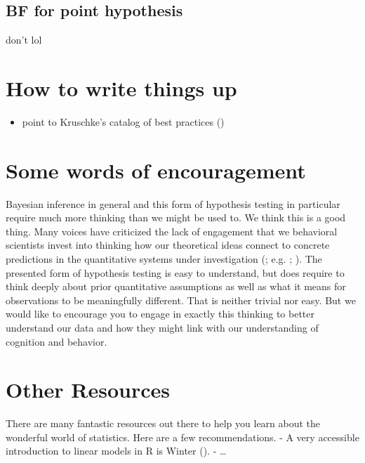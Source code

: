 \documentclass[
  doc,
  floatsintext,
  longtable,
  nolmodern,
  notxfonts,
  notimes,
  colorlinks=true,linkcolor=blue,citecolor=blue,urlcolor=blue]{apa7}
\providecommand{\tightlist}{%
  \setlength{\itemsep}{0pt}\setlength{\parskip}{0pt}}
\begin{document}
\subsection{BF for point hypothesis}\label{bf-for-point-hypothesis}

don't lol

\section{How to write things up}\label{how-to-write-things-up}

\begin{itemize}
\tightlist
\item
  point to Kruschke's catalog of best practices
  ()
\end{itemize}

\section{Some words of encouragement}\label{some-words-of-encouragement}

Bayesian inference in general and this form of hypothesis testing in
particular require much more thinking than we might be used to. We think
this is a good thing. Many voices have criticized the lack of engagement
that we behavioral scientists invest into thinking how our theoretical
ideas connect to concrete predictions in the quantitative systems under
investigation (; e.g. ;
). The
presented form of hypothesis testing is easy to understand, but does
require to think deeply about prior quantitative assumptions as well as
what it means for observations to be meaningfully different. That is
neither trivial nor easy. But we would like to encourage you to engage
in exactly this thinking to better understand our data and how they
might link with our understanding of cognition and behavior.

\section{Other Resources}\label{other-resources}

There are many fantastic resources out there to help you learn about the
wonderful world of statistics. Here are a few recommendations. - A very
accessible introduction to linear models in R is Winter
(). - \ldots{}
\end{document}
